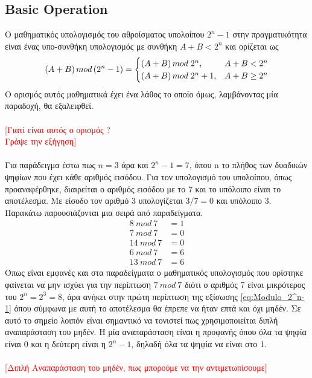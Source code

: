\subsection{Basic Operation}
Ο μαθηματικός υπολογισμός του αθροίσματος υπολοίπου $2^n-1$ στην πραγματικότητα είναι 
ένας υπο-συνθήκη υπολογισμός με συνθήκη $A+B < 2^n$ και ορίζεται ως 
\begin{equation}
\label{eq:Modulo_2^n-1}
\equationame{Ορισμός άθροισης υπολοίπου $2^n-1$}
(A+B)\, mod\, (2^n-1) = 
\begin{cases}
    (A+B)\, mod\; 2^n       , &  A+B < 2^n\\
    (A+B)\, mod\; 2^n + 1   , & A+B \geq 2^n
\end{cases}
\end{equation}
Ο ορισμός αυτός μαθηματικά έχει ένα λάθος το οποίο όμως, λαμβάνοντας μία 
παραδοχή, θα εξαλειφθεί.
\\\\
\textcolor{red}{[Γιατί είναι αυτός ο ορισμός ? \\ Γράψε την εξήγηση]}
\\\\
Για παράδειγμα έστω πως $n=3$ άρα και $2^n-1 = 7$, όπου n το πλήθος των δυαδικών ψηφίων
που έχει κάθε αριθμός εισόδου. Για τον υπολογισμό του υπολοίπου, όπως προαναφέρθηκε,
διαιρείται ο αριθμός εισόδου με το 7 και το υπόλοιπο είναι το αποτέλεσμα. Με είσοδο 
τον αριθμό 3 υπολογίζεται $3/7 = 0$ και υπόλοιπο 3. Παρακάτω παρουσιάζονται μια σειρά από 
παραδείγματα.
\begin{equation*}
    \begin{split}
        8\ mod\ 7 &= 1 \\
        7\ mod\ 7 &= 0 \\
        14\ mod\ 7 &= 0 \\
        6\ mod\ 7 &= 6 \\
        13\ mod\ 7 &= 6
    \end{split}
\end{equation*}
Όπως είναι εμφανές και στα παραδείγματα ο μαθηματικός υπολογισμός που ορίστηκε φαίνεται να 
μην ισχύει για την περίπτωση $7\ mod\ 7$ διότι ο αριθμός 7 είναι μικρότερος του $2^n = 2^3 = 8$,
άρα ανήκει στην πρώτη περίπτωση της εξίσωσης \ref{eq:Modulo_2^n-1} όπου σύμφωνα με αυτή το 
αποτέλεσμα θα έπρεπε να ήταν επτά και όχι μηδέν. Σε αυτό το σημείο λοιπόν είναι σημαντικό
να τονιστεί πως χρησιμοποιείται διπλή αναπαράσταση του μηδέν. Η μία αναπαράσταση είναι η 
προφανής όπου όλα τα ψηφία είναι 0 και η δεύτερη είναι η $2^n-1$, δηλαδή όλα τα ψηφία 
να είναι στο 1.
\\\\
\textcolor{red}{[Διπλή Αναπαράσταση του μηδέν, πως μπορούμε να την αντιμετωπίσουμε]}
\\\\

